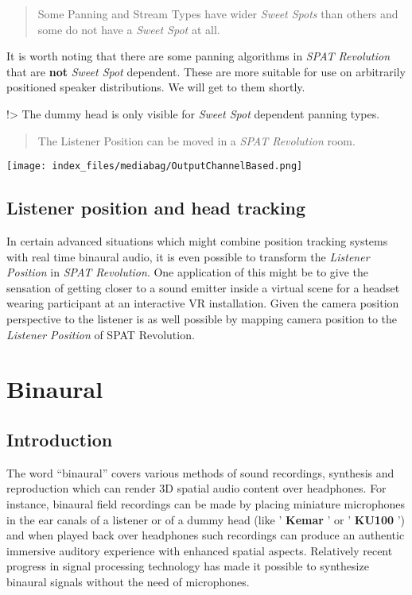 \documentclass[
  letterpaper,
  DIV=11,
  numbers=noendperiod]{scrreport}
\begin{document}
\begin{quote}
Some Panning and Stream Types have wider \emph{Sweet Spots} than others
and some do not have a \emph{Sweet Spot} at all.
\end{quote}

It is worth noting that there are some panning algorithms in \emph{SPAT
Revolution} that are \textbf{not} \emph{Sweet Spot} dependent. These are
more suitable for use on arbitrarily positioned speaker distributions.
We will get to them shortly.

!\textgreater{} The dummy head is only visible for \emph{Sweet Spot}
dependent panning types.

\begin{quote}
The Listener Position can be moved in a \emph{SPAT Revolution} room.
\end{quote}

\texttt{[image: index\_files/mediabag/OutputChannelBased.png]}

\hypertarget{listener-position-and-head-tracking}{%
\section{Listener position and head
tracking}\label{listener-position-and-head-tracking}}

In certain advanced situations which might combine position tracking
systems with real time binaural audio, it is even possible to transform
the \emph{Listener Position} in \emph{SPAT Revolution}. One application
of this might be to give the sensation of getting closer to a sound
emitter inside a virtual scene for a headset wearing participant at an
interactive VR installation. Given the camera position perspective to
the listener is as well possible by mapping camera position to the
\emph{Listener Position} of SPAT Revolution.

\hypertarget{binaural}{%
\chapter{Binaural}\label{binaural}}

\hypertarget{introduction}{%
\section{Introduction}\label{introduction}}

The word ``binaural'' covers various methods of sound recordings,
synthesis and reproduction which can render 3D spatial audio content
over headphones. For instance, binaural field recordings can be made by
placing miniature microphones in the ear canals of a listener or of a
dummy head (like ' \textbf{Kemar} ' or ' \textbf{KU100} ') and when
played back over headphones such recordings can produce an authentic
immersive auditory experience with enhanced spatial aspects. Relatively
recent progress in signal processing technology has made it possible to
synthesize binaural signals without the need of microphones.
\end{document}
